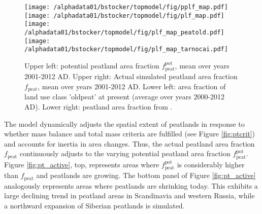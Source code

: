 \begin{figure}
\begin{center}
  \texttt{[image: /alphadata01/bstocker/topmodel/fig/pplf\_map.pdf]}
  \texttt{[image: /alphadata01/bstocker/topmodel/fig/plf\_map.pdf]}\\
  \texttt{[image: /alphadata01/bstocker/topmodel/fig/plf\_map\_peatold.pdf]}
  \texttt{[image: /alphadata01/bstocker/topmodel/fig/plf\_map\_tarnocai.pdf]}\\
\end{center}
\caption{Upper left: potential peatland area fraction $f_{\text{peat}}^{\text{pot}}$, mean over years 2001-2012 AD. Upper right: Actual simulated peatland area fraction $f_{\text{peat}}$, mean over years 2001-2012 AD. Lower left: area fraction of land use class 'oldpeat' at present (average over years 2000-2012 AD). Lower right: peatland area fraction from \citet{tarnocai09gbc}.}
\label{fig:plf}
\end{figure}

The model dynamically adjusts the spatial extent of peatlands in response to whether mass balance and total mass criteria are fulfilled (see Figure \ref{fig:ptcrit}) and accounts for inertia in area changes. Thus, the actual peatland area fraction $f_{\text{peat}}$ continuously adjusts to the varying potential peatland area fraction $f_{\text{peat}}^{\text{pot}}$. Figure \ref{fig:pt_active}, top, represents areas where $f_{\text{peat}}^{\text{pot}}$ is considerably higher than $f_{\text{peat}}$ and peatlands are growing. The bottom panel of Figure \ref{fig:pt_active} analogously represents areas where peatlands are shrinking today. This exhibits a large declining trend in peatland areas in Scandinavia and western Russia, while a northward expansion of Siberian peatlands is simulated.\\

